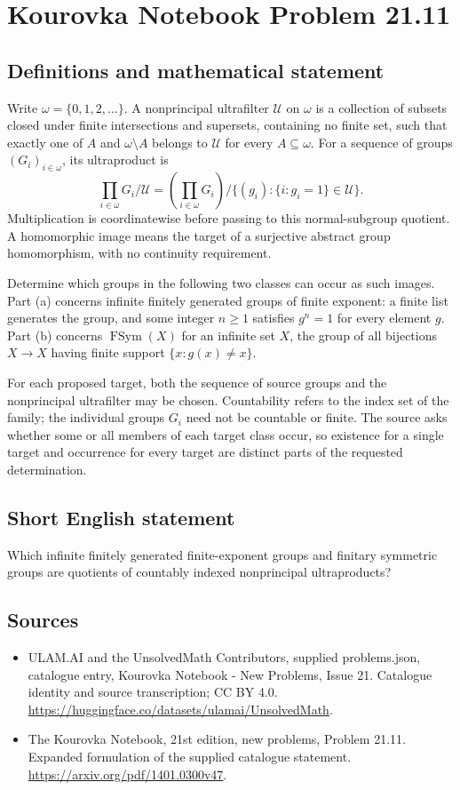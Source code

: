 \documentclass[11pt,a4paper]{article}
\begin{document}
\section*{Kourovka Notebook Problem 21.11}\label{statement}

\subsection{Definitions and mathematical statement}
Write $\omega=\{0,1,2,\ldots\}$. A nonprincipal ultrafilter $\mathcal U$
on $\omega$ is a collection of subsets closed under finite intersections
and supersets, containing no finite set, such that exactly one of $A$
and $\omega\setminus A$ belongs to $\mathcal U$ for every $A\subseteq\omega$.
For a sequence of groups $(G_i)_{i\in\omega}$, its ultraproduct is
\[
 \prod_{i\in\omega}G_i/\mathcal U
 =\left(\prod_{i\in\omega}G_i\right)/
   \{(g_i):\{i:g_i=1\}\in\mathcal U\}.
\]
Multiplication is coordinatewise before passing to this normal-subgroup
quotient. A homomorphic image means the target of a surjective abstract
group homomorphism, with no continuity requirement.

Determine which groups in the following two classes can occur as such
images. Part (a) concerns infinite finitely generated groups of finite
exponent: a finite list generates the group, and some integer $n\ge1$
satisfies $g^n=1$ for every element $g$. Part (b) concerns
$\operatorname{FSym}(X)$ for an infinite set $X$, the group of all
bijections $X\to X$ having finite support $\{x:g(x)\ne x\}$.

For each proposed target, both the sequence of source groups and the
nonprincipal ultrafilter may be chosen. Countability refers to the
index set of the family; the individual groups $G_i$ need not be
countable or finite. The source asks whether some or all members of
each target class occur, so existence for a single target and occurrence
for every target are distinct parts of the requested determination.
\subsection{Short English statement}
Which infinite finitely generated finite-exponent groups and finitary symmetric groups are quotients of countably indexed nonprincipal ultraproducts?
\subsection{Sources}
\begin{itemize}
\item[S1] ULAM.AI and the UnsolvedMath Contributors, supplied problems.json, catalogue entry, Kourovka Notebook - New Problems, Issue 21. Catalogue identity and source transcription; CC BY 4.0.
\url{https://huggingface.co/datasets/ulamai/UnsolvedMath}.
\item[S2] The Kourovka Notebook, 21st edition, new problems, Problem 21.11. Expanded formulation of the supplied catalogue statement.
\url{https://arxiv.org/pdf/1401.0300v47}.
\end{itemize}
\end{document}
